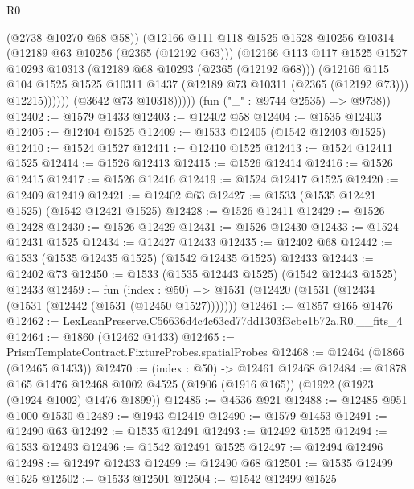 \begin{lexlean}{R0}
\begin{coremodule}
                      (@2738 @10270 @68 @58))
                    (@12166
                      @111
                      @118
                      @1525
                      @1528
                      @10256
                      @10314
                      (@12189 @63 @10256 (@2365 (@12192 @63)))
                      (@12166
                        @113
                        @117
                        @1525
                        @1527
                        @10293
                        @10313
                        (@12189 @68 @10293 (@2365 (@12192 @68)))
                        (@12166
                          @115
                          @104
                          @1525
                          @1525
                          @10311
                          @1437
                          (@12189 @73 @10311 (@2365 (@12192 @73)))
                          @12215))))))
              (@3642 @73 @10318)))))
      (fun ("_" : @9744 @2535) => @9738))
@12402 := @1579 @1433
@12403 := @12402 @58
@12404 := @1535 @12403
@12405 := @12404 @1525
@12409 := @1533 @12405 (@1542 @12403 @1525)
@12410 := @1524 @1527
@12411 := @12410 @1525
@12413 := @1524 @12411 @1525
@12414 := @1526 @12413
@12415 := @1526 @12414
@12416 := @1526 @12415
@12417 := @1526 @12416
@12419 := @1524 @12417 @1525
@12420 := @12409 @12419
@12421 := @12402 @63
@12427 := @1533 (@1535 @12421 @1525) (@1542 @12421 @1525)
@12428 := @1526 @12411
@12429 := @1526 @12428
@12430 := @1526 @12429
@12431 := @1526 @12430
@12433 := @1524 @12431 @1525
@12434 := @12427 @12433
@12435 := @12402 @68
@12442 := @1533 (@1535 @12435 @1525) (@1542 @12435 @1525) @12433
@12443 := @12402 @73
@12450 := @1533 (@1535 @12443 @1525) (@1542 @12443 @1525) @12433
@12459 := fun (index : @50) =>
  @1531 (@12420 (@1531 (@12434 (@1531 (@12442 (@1531 (@12450 @1527)))))))
@12461 := @1857 @165 @1476
@12462 := LexLeanPreserve.C56636d4c4c63cd77dd1303f3cbe1b72a.R0.__fits_4
@12464 := @1860 (@12462 @1433)
@12465 := PrismTemplateContract.FixtureProbes.spatialProbes
@12468 := @12464 (@1866 (@12465 @1433))
@12470 := (index : @50) -> @12461 @12468
@12484 := @1878
    @165
    @1476
    @12468
    @1002
    @4525
    (@1906 (@1916 @165))
    (@1922 (@1923 (@1924 @1002) @1476 @1899))
@12485 := @4536 @921
@12488 := @12485 @951 @1000 @1530
@12489 := @1943 @12419
@12490 := @1579 @1453
@12491 := @12490 @63
@12492 := @1535 @12491
@12493 := @12492 @1525
@12494 := @1533 @12493
@12496 := @1542 @12491 @1525
@12497 := @12494 @12496
@12498 := @12497 @12433
@12499 := @12490 @68
@12501 := @1535 @12499 @1525
@12502 := @1533 @12501
@12504 := @1542 @12499 @1525

\end{coremodule}
\end{lexlean}
